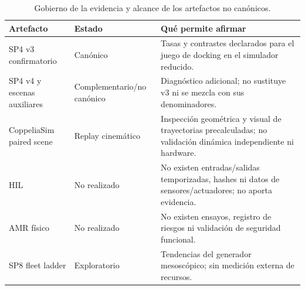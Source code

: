 \begin{table}[H]
\centering
\scriptsize
\begin{tabularx}{\textwidth}{@{}p{}p{}X@{}}
\toprule
Artefacto & Estado & Qué permite afirmar \\
\midrule
SP4 v3 confirmatorio & Canónico & Tasas y contrastes declarados para el juego de docking en el simulador reducido. \\
SP4 v4 y escenas auxiliares & Complementario/no canónico & Diagnóstico adicional; no sustituye v3 ni se mezcla con sus denominadores. \\
CoppeliaSim paired scene & Replay cinemático & Inspección geométrica y visual de trayectorias precalculadas; no validación dinámica independiente ni hardware. \\
HIL & No realizado & No existen entradas/salidas temporizadas, hashes ni datos de sensores/actuadores; no aporta evidencia. \\
AMR físico & No realizado & No existen ensayos, registro de riesgos ni validación de seguridad funcional. \\
SP8 fleet ladder & Exploratorio & Tendencias del generador mesoscópico; sin medición externa de recursos. \\
\bottomrule
\end{tabularx}
\caption{Gobierno de la evidencia y alcance de los artefactos no canónicos.}
\label{tab:identidad-evidencia}
\end{table}

